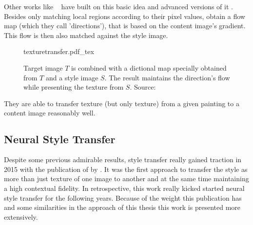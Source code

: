 Other works like \citeauthor*{texturetransfer}~\cite{texturetransfer} have built on this basic idea and advanced versions of it \cite{fasttexturetransfer} \cite{texturetransfer}.
Besides only matching local regions according to their pixel values, \citeauthor*{texturetransfer} obtain a flow map (which they call 'directions'), that is based on the content image's gradient.
This flow is then also matched against the style image.
\begin{figure}
    \begin{tiny}
    \def\svgwidth{\textwidth}
    {texturetransfer.pdf_tex}
    \end{tiny}
    \caption[]{Target image $T$ is combined with a dictional map specially obtained from $T$ and a style image  $S$. The result maintains the direction's flow while presenting the texture from $S$. Source:~\cite{texturetransfer}}
\end{figure}
They are able to transfer texture (but only texture) from a given painting to a content image reasonably well.





\subsection{Neural Style Transfer}
Despite some previous admirable results\cite{texturetransfer}, style transfer really gained traction in 2015 with the publication of  by \citeauthor*{gatys}.
It was the first approach to transfer the style as more than just texture of one image to another and at the same time maintaining a high contextual fidelity.
In retrospective, this work really kicked started neural style transfer for the following years.
Because of the weight this publication has and some similarities in the approach of this thesis this work is presented more extensively.


